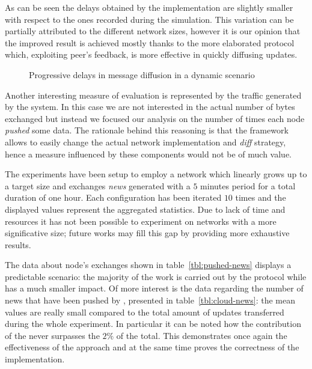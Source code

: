 As can be seen the delays obtained by the \cloudypeer implementation
are slightly smaller with respect to the ones recorded during the
simulation.
This variation can be partially attributed to
the different network sizes, however it is our opinion that the
improved result is achieved mostly thanks to the more elaborated
\rumormongering protocol which, exploiting peer's feedback, is more
effective in quickly diffusing updates.

\begin{figure}[H]
  \centering
  \caption{Progressive delays in message diffusion in a dynamic scenario}
  \label{fig:cloudcast-globa-delay}
\end{figure}

Another interesting measure of evaluation is represented by the
traffic generated by the system. In this case we are not interested
in the actual number of bytes exchanged but instead we focused our
analysis on the number of times each node \textit{pushed} some
data. The rationale behind this reasoning is that the framework allows
to easily change the actual network implementation and \textit{diff}
strategy, hence a measure influenced by these components would not be
of much value.

The experiments have been setup to employ a network
which linearly grows up to a target size and exchanges \textit{news}
generated with a $5$ minutes period for a total duration of one hour.
Each configuration has been iterated $10$ times and the displayed
values represent the aggregated statistics.
Due to lack of time and resources it has not been possible to
experiment on networks with a more significative size; future works may
fill this gap by providing more exhaustive results.

The data about node's exchanges shown in table~\ref{tbl:pushed-news}
displays a predictable scenario: the majority of the
work is carried out by the \rumormongering protocol while \antientropy
has a much smaller impact. Of more interest is the data regarding the
number of news that have been pushed by \cloud, presented in
table~\ref{tbl:cloud-news}: the mean values are really small compared
to the total amount of updates transferred during the whole
experiment. In particular it can be noted how the contribution of the
\cloud never surpasses the $2\%$ of the total. This demonstrates once
again the effectiveness of the \cloudcast approach and at the same
time proves the correctness of the implementation.

